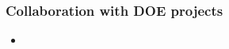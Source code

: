 \begin{frame}
\frametitle{Collaboration with DOE projects}

\begin{itemize}
\item 
\end{itemize}

\end{frame}


